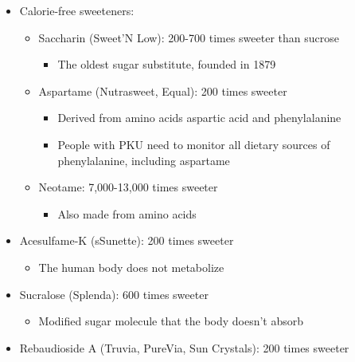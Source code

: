 \documentclass[12pt]{article}
\begin{document}
\begin{itemize}
\begin{itemize}
\begin{itemize}
                            \end{itemize}
                    \end{itemize}
                \item Calorie-free sweeteners:
                    \begin{itemize}
                        \item Saccharin (Sweet'N Low): 200-700 times sweeter than sucrose
                            \begin{itemize}
                                \item The oldest sugar substitute, founded in 1879
                            \end{itemize}
                        \item Aspartame (Nutrasweet, Equal): 200 times sweeter
                            \begin{itemize}
                                \item Derived from amino acids aspartic acid and phenylalanine
                                \item People with PKU need to monitor all dietary sources of phenylalanine, including aspartame
                            \end{itemize}
                        \item Neotame: 7,000-13,000 times sweeter
                            \begin{itemize}
                                \item Also made from amino acids
                            \end{itemize}
                    \end{itemize}
                \item Acesulfame-K (sSunette): 200 times sweeter
                    \begin{itemize}
                        \item The human body does not metabolize
                    \end{itemize}
                \item Sucralose (Splenda): 600 times sweeter
                    \begin{itemize}
                        \item Modified sugar molecule that the body doesn't absorb
                    \end{itemize}
                \item Rebaudioside A (Truvia, PureVia, Sun Crystals): 200 times sweeter

\end{itemize}
\end{document}
